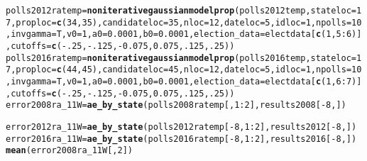 \documentclass{article}\usepackage[]{graphicx}\usepackage[]{color}
\makeatletter
\newcommand{\hlnum}[1]{\textcolor[rgb]{0.686,0.059,0.569}{#1}}%
\newcommand{\hlopt}[1]{\textcolor[rgb]{0,0,0}{#1}}%
\newcommand{\hlstd}[1]{\textcolor[rgb]{0.345,0.345,0.345}{#1}}%
\newcommand{\hlkwb}[1]{\textcolor[rgb]{0.69,0.353,0.396}{#1}}%
\newcommand{\hlkwc}[1]{\textcolor[rgb]{0.333,0.667,0.333}{#1}}%
\newcommand{\hlkwd}[1]{\textcolor[rgb]{0.737,0.353,0.396}{\textbf{#1}}}%
\newenvironment{kframe}{%
 \def\at@end@of@kframe{}%
 \ifinner\ifhmode%
  \def\at@end@of@kframe{\end{minipage}}%
  \begin{minipage}{\columnwidth}%
 \fi\fi%
 \def\FrameCommand##1{\hskip\@totalleftmargin \hskip-\fboxsep
 \colorbox{shadecolor}{##1}\hskip-\fboxsep
     \hskip-\linewidth \hskip-\@totalleftmargin \hskip\columnwidth}%
 \MakeFramed {\advance\hsize-\width
   \@totalleftmargin\z@ \linewidth\hsize
   \@setminipage}}%
 {\par\unskip\endMakeFramed%
 \at@end@of@kframe}
\newenvironment{knitrout}{}{} %
\makeatother
\begin{document}
\begin{knitrout}
\begin{kframe}
\begin{alltt}
\hlstd{polls2012ratemp} \hlkwb{=} \hlkwd{noniterativegaussianmodelprop}\hlstd{(polls2012temp,} \hlkwc{stateloc} \hlstd{=} \hlnum{17}\hlstd{,} \hlkwc{proploc} \hlstd{=} \hlkwd{c}\hlstd{(}\hlnum{34}\hlstd{,} \hlnum{35}\hlstd{),} \hlkwc{candidateloc} \hlstd{=} \hlnum{35}\hlstd{,}  \hlkwc{nloc} \hlstd{=} \hlnum{12}\hlstd{,} \hlkwc{dateloc} \hlstd{=} \hlnum{5}\hlstd{,} \hlkwc{idloc} \hlstd{=} \hlnum{1}\hlstd{,}  \hlkwc{npolls} \hlstd{=} \hlnum{10}\hlstd{,}\hlkwc{invgamma} \hlstd{= T,} \hlkwc{v0}\hlstd{=}\hlnum{1}\hlstd{,} \hlkwc{a0}\hlstd{=}\hlnum{0.0001}\hlstd{,} \hlkwc{b0}\hlstd{=}\hlnum{0.0001}\hlstd{,}  \hlkwc{election_data} \hlstd{= electdata[}\hlkwd{c}\hlstd{(}\hlnum{1}\hlstd{,} \hlnum{5}\hlopt{:}\hlnum{6}\hlstd{)],} \hlkwc{cutoffs} \hlstd{=} \hlkwd{c}\hlstd{(}\hlopt{-}\hlnum{.25}\hlstd{,} \hlopt{-}\hlnum{.125}\hlstd{,} \hlopt{-}\hlnum{0.075}\hlstd{,} \hlnum{0.075}\hlstd{,} \hlnum{.125}\hlstd{,} \hlnum{.25}\hlstd{))}
\hlstd{polls2016ratemp} \hlkwb{=} \hlkwd{noniterativegaussianmodelprop}\hlstd{(polls2016temp,} \hlkwc{stateloc} \hlstd{=} \hlnum{17}\hlstd{,} \hlkwc{proploc} \hlstd{=} \hlkwd{c}\hlstd{(}\hlnum{44}\hlstd{,} \hlnum{45}\hlstd{),} \hlkwc{candidateloc} \hlstd{=} \hlnum{45}\hlstd{,} \hlkwc{nloc} \hlstd{=} \hlnum{12}\hlstd{,} \hlkwc{dateloc} \hlstd{=} \hlnum{5}\hlstd{,} \hlkwc{idloc} \hlstd{=} \hlnum{1}\hlstd{,}\hlkwc{npolls} \hlstd{=} \hlnum{10}\hlstd{,} \hlkwc{invgamma} \hlstd{= T,} \hlkwc{v0}\hlstd{=}\hlnum{1}\hlstd{,} \hlkwc{a0}\hlstd{=}\hlnum{0.0001}\hlstd{,} \hlkwc{b0}\hlstd{=}\hlnum{0.0001}\hlstd{,} \hlkwc{election_data} \hlstd{= electdata[}\hlkwd{c}\hlstd{(}\hlnum{1}\hlstd{,} \hlnum{6}\hlopt{:}\hlnum{7}\hlstd{)],} \hlkwc{cutoffs} \hlstd{=} \hlkwd{c}\hlstd{(}\hlopt{-}\hlnum{.25}\hlstd{,} \hlopt{-}\hlnum{.125}\hlstd{,} \hlopt{-}\hlnum{0.075}\hlstd{,} \hlnum{0.075}\hlstd{,} \hlnum{.125}\hlstd{,} \hlnum{.25}\hlstd{))}
\hlstd{error2008ra_11W} \hlkwb{=} \hlkwd{ae_by_state}\hlstd{(polls2008ratemp[,} \hlnum{1}\hlopt{:}\hlnum{2}\hlstd{], results2008[}\hlopt{-}\hlnum{8}\hlstd{, ])}
\end{alltt}


{\ttfamily\noindent\color{warningcolor}{\#\# Warning in ae\_by\_state(polls2008ratemp[, 1:2], results2008[-8, ]): Predicted names do not match names of actual data}}

{\ttfamily\noindent\bfseries\color{errorcolor}{\#\# Error in ae\_by\_state(polls2008ratemp[, 1:2], results2008[-8, ]): Incompatiable dimensions of predicted and actual}}\begin{alltt}
\hlstd{error2012ra_11W} \hlkwb{=} \hlkwd{ae_by_state}\hlstd{(polls2012ratemp[}\hlopt{-}\hlnum{8}\hlstd{,} \hlnum{1}\hlopt{:}\hlnum{2}\hlstd{], results2012[}\hlopt{-}\hlnum{8}\hlstd{, ])}
\hlstd{error2016ra_11W} \hlkwb{=} \hlkwd{ae_by_state}\hlstd{(polls2016ratemp[}\hlopt{-}\hlnum{8}\hlstd{,} \hlnum{1}\hlopt{:}\hlnum{2}\hlstd{], results2016[}\hlopt{-}\hlnum{8}\hlstd{, ])}
\hlkwd{mean}\hlstd{(error2008ra_11W[,}\hlnum{2}\hlstd{])}
\end{alltt}



\end{kframe}
\end{knitrout}
\end{document}
